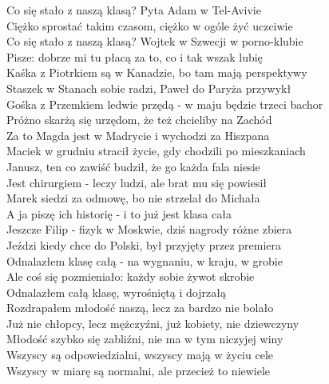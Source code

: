
\begin{flushleft}
Co się stało z naszą klasą? Pyta Adam w Tel-Avivie \\
Ciężko sprostać takim czasom, ciężko w ogóle żyć uczciwie \\
Co się stało z naszą klasą? Wojtek w Szwecji w porno-klubie \\
Pisze: dobrze mi tu płacą za to, co i tak wszak lubię \\
\vskip 3mm
Kaśka z Piotrkiem są w Kanadzie, bo tam mają perspektywy \\
Staszek w Stanach sobie radzi, Paweł do Paryża przywykł \\
Gośka z Przemkiem ledwie przędą - w maju będzie trzeci bachor \\
Próżno skarżą się urzędom, że też chcieliby na Zachód \\
\vskip 3mm
Za to Magda jest w Madrycie i wychodzi za Hiszpana \\
Maciek w grudniu stracił życie, gdy chodzili po mieszkaniach \\
Janusz, ten co zawiść budził, że go każda fala niesie \\
Jest chirurgiem - leczy ludzi, ale brat mu się powiesił \\
\vskip 3mm
Marek siedzi za odmowę, bo nie strzelał do Michała \\
A ja piszę ich historię - i to już jest klasa cała \\
Jeszcze Filip - fizyk w Moskwie, dziś nagrody różne zbiera \\
Jeździ kiedy chce do Polski, był przyjęty przez premiera \\
\vskip 3mm
Odnalazłem klasę całą - na wygnaniu, w kraju, w grobie \\
Ale coś się pozmieniało: każdy sobie żywot skrobie \\
Odnalazłem całą klasę, wyrośniętą i dojrzałą \\
Rozdrapałem młodość naszą, lecz za bardzo nie bolało \\
\vskip 3mm
Już nie chłopcy, lecz mężczyźni, już kobiety, nie dziewczyny \\
Młodość szybko się zabliźni, nie ma w tym niczyjej winy \\
Wszyscy są odpowiedzialni, wszyscy mają w życiu cele \\
Wszyscy w miarę są normalni, ale przecież to niewiele \\

\end{flushleft}
